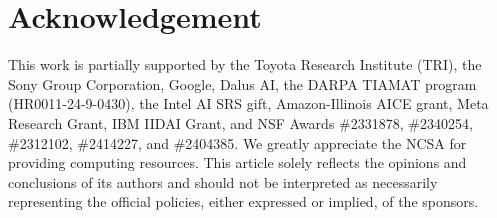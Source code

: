 \section*{Acknowledgement}
This work is partially supported by the Toyota Research Institute (TRI), the Sony Group Corporation, Google, Dalus AI, the DARPA TIAMAT program (HR0011-24-9-0430), the Intel AI SRS gift, Amazon-Illinois AICE grant, Meta Research Grant, IBM IIDAI Grant, and NSF Awards \#2331878, \#2340254, \#2312102, \#2414227, and \#2404385. We greatly appreciate the NCSA for providing computing resources. This article solely reflects the opinions and conclusions of its authors and should not be interpreted as necessarily representing the official policies, either expressed or implied, of the sponsors.
